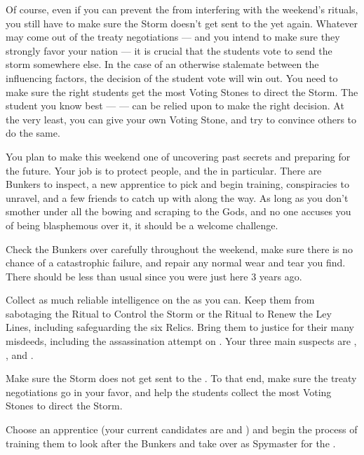 \documentclass[char]{GL2020}
\begin{document}
Of course, even if you can prevent the \pGoaties{} from interfering with the weekend's rituals, you still have to make sure the Storm doesn't get sent to the \pShip{} yet again. Whatever may come out of the treaty negotiations — and you intend to make sure they strongly favor your nation — it is crucial that the students vote to send the storm somewhere else. In the case of an otherwise stalemate between the influencing factors, the decision of the student vote will win out. You need to make sure the right students get the most Voting Stones to direct the Storm. The \pShippie{} student you know best — \cInitiate{} — can be relied upon to make the right decision. At the very least, you can give \cInitiate{} your own Voting Stone, and try to convince others to do the same.

You plan to make this weekend one of uncovering past secrets and preparing for the future. Your job is to protect people, and the \pShippies{} in particular. There are Bunkers to inspect, a new apprentice to pick and begin training, conspiracies to unravel, and a few friends to catch up with along the way. As long as you don't smother under all the bowing and scraping to the Gods, and no one accuses you of being blasphemous over it, it should be a welcome challenge.

\begin{itemz}
    \item Check the Bunkers over carefully throughout the weekend, make sure there is no chance of a catastrophic failure, and repair any normal wear and tear you find. There should be less than usual since you were just here 3 years ago.
    \item Collect as much reliable intelligence on the \pGoaties{} as you can. Keep them from sabotaging the Ritual to Control the Storm or the Ritual to Renew the Ley Lines, including safeguarding the six Relics. Bring them to justice for their many misdeeds, including the assassination attempt on \cHeadDiplomat{}. Your three main suspects are \cChupLeader{}, \cJuniorStatesman{}, and \cEbbPriest{}.
    \item Make sure the Storm does not get sent to the \pShip{}. To that end, make sure the treaty negotiations go in your favor, and help the \pShippie{} students collect the most Voting Stones to direct the Storm.
    \item Choose an apprentice (your current candidates are \cTechStar{} and \cInitiate{}) and begin the process of training them to look after the Bunkers and take over as Spymaster for the \pShippies{}.
\end{itemz}
\end{document}

